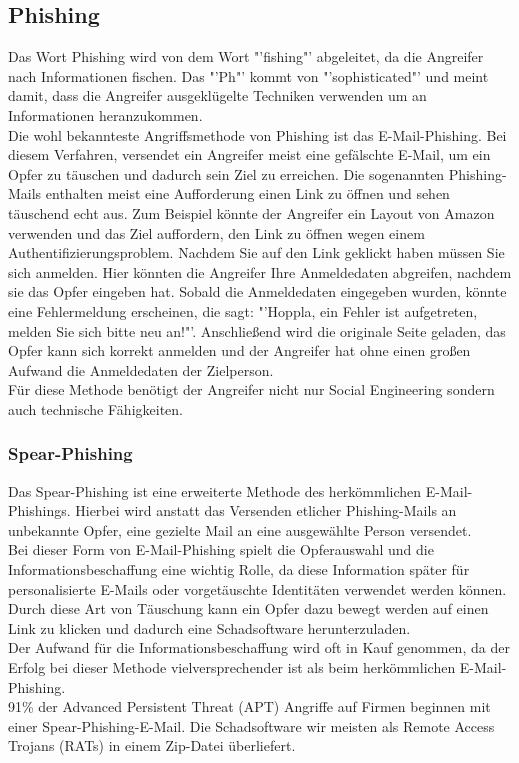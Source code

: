 		\subsection{Phishing}
		Das Wort Phishing wird von dem Wort "'fishing"' abgeleitet, da die Angreifer nach Informationen fischen. Das "'Ph"' kommt von "'sophisticated"' und meint damit, dass die Angreifer ausgeklügelte Techniken verwenden um an Informationen heranzukommen.\cite{PhishingExposed}\\
		Die wohl bekannteste Angriffsmethode von Phishing ist das E-Mail-Phishing. Bei diesem Verfahren, versendet ein Angreifer meist eine gefälschte E-Mail, um ein Opfer zu täuschen und dadurch sein Ziel zu erreichen. Die sogenannten Phishing-Mails enthalten meist eine Aufforderung einen Link zu öffnen und sehen täuschend echt aus. Zum Beispiel könnte der Angreifer ein Layout von Amazon verwenden und das Ziel auffordern, den Link zu öffnen wegen einem Authentifizierungsproblem. Nachdem Sie auf den Link geklickt haben müssen Sie sich anmelden. Hier könnten die Angreifer Ihre Anmeldedaten abgreifen, nachdem sie das Opfer eingeben hat. Sobald die Anmeldedaten eingegeben wurden, könnte eine Fehlermeldung erscheinen, die sagt: "'Hoppla, ein Fehler ist aufgetreten, melden Sie sich bitte neu an!"'. Anschließend wird die originale Seite geladen, das Opfer kann sich korrekt anmelden und der Angreifer hat ohne einen großen Aufwand die Anmeldedaten der Zielperson.\\
		Für diese Methode benötigt der Angreifer nicht nur Social Engineering  sondern auch technische Fähigkeiten.\cite{PhishingDarkWaters}
		
		\subsubsection{Spear-Phishing}
		Das Spear-Phishing ist eine erweiterte Methode des herkömmlichen E-Mail-Phishings. Hierbei wird anstatt das Versenden etlicher Phishing-Mails an unbekannte Opfer, eine gezielte Mail an eine ausgewählte Person versendet.\cite{SpearPhishingPaper}\\
		Bei dieser Form von E-Mail-Phishing spielt die Opferauswahl und die Informationsbeschaffung eine wichtig Rolle, da diese Information später für personalisierte E-Mails oder vorgetäuschte Identitäten verwendet werden können. Durch diese Art von Täuschung kann ein Opfer dazu bewegt werden auf einen Link zu klicken und dadurch eine Schadsoftware herunterzuladen.\cite{SpearPhishingPaper} \\
		Der Aufwand für die Informationsbeschaffung wird oft in Kauf genommen, da der Erfolg bei dieser Methode vielversprechender ist als beim herkömmlichen E-Mail-Phishing.\\
		91\% der Advanced Persistent Threat (APT) Angriffe auf Firmen beginnen mit einer Spear-Phishing-E-Mail. Die Schadsoftware wir meisten als Remote Access Trojans (RATs) in einem Zip-Datei überliefert.\cite{SpearPhishing}


